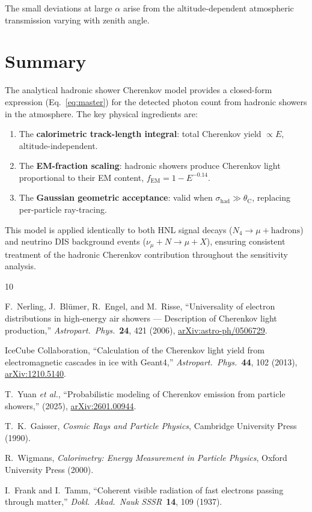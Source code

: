 \documentclass[11pt]{article}
\newcommand{\fEM}{f_{\mathrm{EM}}}
\newcommand{\shad}{\sigma_{\mathrm{had}}}
\newcommand{\thetaC}{\theta_{\mathrm{C}}}
\begin{document}
\noindent
The small deviations at large $\alpha$ arise from the
altitude-dependent atmospheric transmission varying with zenith angle.

\section{Summary}
\label{sec:summary}

The analytical hadronic shower Cherenkov model provides a closed-form
expression (Eq.~\ref{eq:master}) for the detected photon count from
hadronic showers in the atmosphere.  The key physical ingredients are:

\begin{enumerate}[nosep]
  \item The \textbf{calorimetric track-length integral}: total
    Cherenkov yield $\propto E$, altitude-independent.
  \item The \textbf{EM-fraction scaling}: hadronic showers produce
    Cherenkov light proportional to their EM content,
    $\fEM = 1 - E^{-0.14}$.
  \item The \textbf{Gaussian geometric acceptance}: valid when
    $\shad \gg \thetaC$, replacing per-particle ray-tracing.
\end{enumerate}

\noindent
This model is applied identically to both HNL signal decays
($N_4 \to \mu + \text{hadrons}$) and neutrino DIS background events
($\nu_\mu + N \to \mu + X$), ensuring consistent treatment of the
hadronic Cherenkov contribution throughout the sensitivity analysis.

\begin{thebibliography}{10}

F.~Nerling, J.~Bl\"umer, R.~Engel, and M.~Risse,
``Universality of electron distributions in high-energy air showers ---
Description of Cherenkov light production,''
\textit{Astropart.\ Phys.}\ \textbf{24}, 421 (2006),
\href{https://arxiv.org/abs/astro-ph/0506729}{arXiv:astro-ph/0506729}.

IceCube Collaboration,
``Calculation of the Cherenkov light yield from electromagnetic
cascades in ice with Geant4,''
\textit{Astropart.\ Phys.}\ \textbf{44}, 102 (2013),
\href{https://arxiv.org/abs/1210.5140}{arXiv:1210.5140}.

T.~Yuan \textit{et al.},
``Probabilistic modeling of Cherenkov emission from particle showers,''
(2025),
\href{https://arxiv.org/abs/2601.00944}{arXiv:2601.00944}.

T.~K.~Gaisser,
\textit{Cosmic Rays and Particle Physics},
Cambridge University Press (1990).

R.~Wigmans,
\textit{Calorimetry: Energy Measurement in Particle Physics},
Oxford University Press (2000).

I.~Frank and I.~Tamm,
``Coherent visible radiation of fast electrons passing through matter,''
\textit{Dokl.\ Akad.\ Nauk SSSR}\ \textbf{14}, 109 (1937).

\end{thebibliography}
\end{document}
